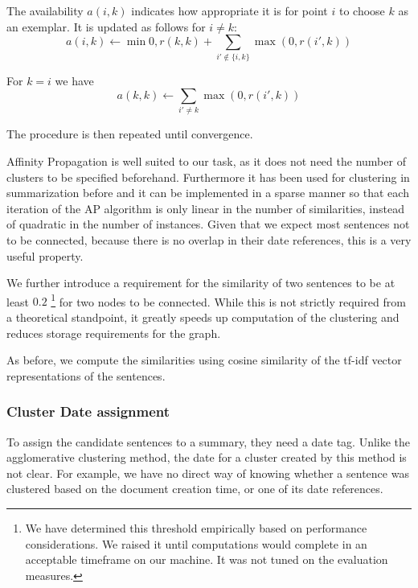 \documentclass[a4paper,BCOR=10mm]{report}
\numberwithin{lemma}{chapter}
\numberwithin{definition}{chapter}
\begin{document}
The availability $a(i, k)$ indicates how appropriate it is for point $i$ to choose $k$ as an exemplar.
It is updated as follows for $i \neq k$:
\begin{equation}
a(i, k) \leftarrow \min 0, r(k, k) + \sum_{i' \not\in \{i, k\}} \max(0, r(i', k))
\end{equation}

For $k = i$ we have
\begin{equation}
a(k, k) \leftarrow \sum_{i' \neq k} \max(0, r(i', k))
\end{equation}

The procedure is then repeated until convergence.

Affinity Propagation is well suited to our task, as it does not need the number of clusters to be specified beforehand. Furthermore it has been used for clustering in summarization before \citep{salient-updates-disaster} and it can be implemented in a sparse manner so that each iteration of the AP algorithm is only linear in the number of similarities, instead of quadratic in the number of instances. Given that we expect most sentences not to be connected, because there is no overlap in their date references, this is a very useful property.

We further introduce a requirement for the similarity of two sentences to be at least $0.2$ \footnote{We have determined this threshold empirically based on performance considerations. We raised it until computations would complete in an acceptable timeframe on our machine. It was not tuned on the evaluation measures.} for two nodes to be connected. While this is not strictly required from a theoretical standpoint, it greatly speeds up computation of the clustering and reduces storage requirements for the graph.

As before, we compute the similarities using cosine similarity of the tf-idf vector representations of the sentences.

\subsubsection{Cluster Date assignment}

To assign the candidate sentences to a summary, they need a date tag. Unlike the agglomerative clustering method, the date for a cluster created by this method is not clear. For example, we have no direct way of knowing whether a sentence was clustered based on the document creation time, or one of its date references.
\end{document}
